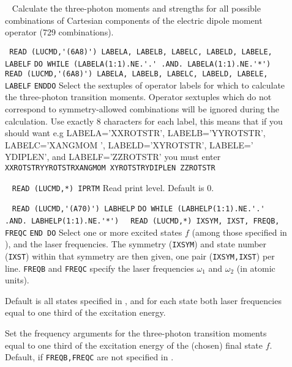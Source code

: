 \begin{description}
\item[] \verb| |\newline
Calculate the three-photon moments and strengths for all possible
combinations of Cartesian 
components of the electric dipole moment operator (729 combinations).
\item[] \verb| |\newline
\verb|READ (LUCMD,'(6A8)') LABELA, LABELB, LABELC, LABELD, LABELE, LABELF|\newline
\verb|DO WHILE (LABELA(1:1).NE.'.' .AND. LABELA(1:1).NE.'*')|\newline
\verb|   READ (LUCMD,'(6A8)') LABELA, LABELB, LABELC, LABELD, LABELE, LABELF|\newline
\verb|ENDDO|\newline   
Select the sextuples of operator labels for which to calculate the three-photon transition
moments. Operator sextuples which do not correspond to symmetry-allowed combinations will be
ignored during the calculation.
Use exactly 8 characters for each label,
this means that if you should want e.g LABELA='XXROTSTR', LABELB='YYROTSTR', LABELC='XANGMOM ', LABELD='XYROTSTR',
LABELE=' YDIPLEN', and LABELF='ZZROTSTR'
you must enter\newline
\verb|XXROTSTRYYROTSTRXANGMOM XYROTSTRYDIPLEN ZZROTSTR|

\item[] \verb| |\newline
\verb|READ (LUCMD,*) IPRTM|\newline
Read print level. Default is 0.
\item[] \verb| | \newline
\verb|READ (LUCMD,'(A70)') LABHELP|\newline
\verb|DO WHILE (LABHELP(1:1).NE.'.' .AND. LABHELP(1:1).NE.'*')|\newline
\verb|  READ (LUCMD,*) IXSYM, IXST, FREQB, FREQC|\newline
\verb|END DO| \newline
Select one or more excited states $f$ (among those specified
in ), and the laser frequencies.
The symmetry (\verb+IXSYM+) and state number (\verb+IXST+)
within that symmetry are then given,
one pair (\verb|IXSYM,IXST|) per line.
\verb+FREQB+ and \verb+FREQC+ specify the 
laser frequencies $\omega_1$ and $\omega_2$ (in atomic units).


Default is all states specified in , and for each state
both laser frequencies equal to one third of the excitation energy.

%
\item[]
Set the frequency arguments for the three-photon transition moments
equal to one third of the excitation energy of the (chosen) 
final state $f$. Default, if \verb+FREQB,FREQC+ are not specified 
in .
%
\end{description}
